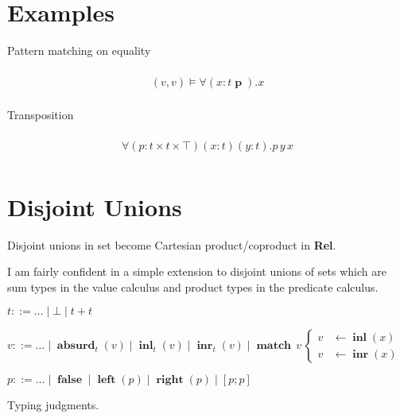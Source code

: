 \documentclass[twocolumn]{scrartcl}
\newcommand{\Rel}{\textbf{Rel}}
\newcommand{\bnfdef}{\mathbin{::=}}
\DeclareMathOperator{\prd}{\textbf{p}}
\DeclareMathOperator{\absurd}{\textbf{absurd}}
\DeclareMathOperator{\inl}{\textbf{inl}}
\DeclareMathOperator{\inr}{\textbf{inr}}
\DeclareMathOperator{\false}{\textbf{false}}
\DeclareMathOperator{\lft}{\textbf{left}}
\DeclareMathOperator{\rgt}{\textbf{right}}
\DeclareMathOperator{\case}{\textbf{match}}
\begin{document}
\section*{Examples}

Pattern matching on equality

\begin{multline*}
  \\
   ( v , v ) \models \forall (x \colon t \prd). x\\
\end{multline*}

Transposition

\begin{multline*}
  \\
   \forall (p \colon t \times t \times \top) (x \colon t) (y \colon t). p \, y \, x\\
\end{multline*}

\section*{Disjoint Unions}

Disjoint unions in set become Cartesian product/coproduct in \Rel.

I am fairly confident in a simple extension to disjoint unions
of sets which are sum types in the value calculus and product types in
the predicate calculus.

\begin{description}[nosep]
\item[Types] \hfill \( t \bnfdef \ldots \mid \bot \mid t + t \)
\item[Values] \hfill \( v \bnfdef \ldots \mid \absurd_t(v) \mid \inl_t(v) \mid \inr_t(v) \mid
  \case \, v \,
  \begin{cases}
    v & \leftarrow \inl(x) \\
    v & \leftarrow \inr(x)
  \end{cases}
  \)
\item[Predicates] \hfill \( p \bnfdef \ldots \mid \false \mid \lft(p) \mid \rgt(p) \mid [ p ; p ] \)
\end{description}

Typing judgments.
\end{document}
